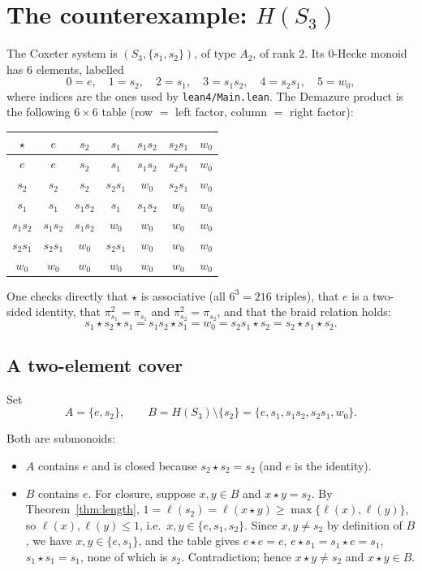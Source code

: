 \documentclass[11pt]{article}
\theoremstyle{definition}
\theoremstyle{remark}
\newcommand{\St}{\star}
\DeclareMathOperator{\len}{\ell}
\begin{document}
\section{The counterexample: $H(S_3)$}

The Coxeter system is $(S_3,\{s_1,s_2\})$, of type $A_2$, of rank $2$. Its
$0$-Hecke monoid has $6$ elements, labelled
\[
0=e,\quad 1=s_2,\quad 2=s_1,\quad 3=s_1s_2,\quad 4=s_2s_1,\quad 5=w_0,
\]
where indices are the ones used by \texttt{lean4/Main.lean}. The Demazure
product is the following $6\times 6$ table (row $=$ left factor, column $=$
right factor):

\begin{center}
\begin{tabular}{c|cccccc}
$\St$ & $e$ & $s_2$ & $s_1$ & $s_1s_2$ & $s_2s_1$ & $w_0$\\
\hline
$e$     & $e$     & $s_2$   & $s_1$   & $s_1s_2$ & $s_2s_1$ & $w_0$\\
$s_2$   & $s_2$   & $s_2$   & $s_2s_1$& $w_0$    & $s_2s_1$ & $w_0$\\
$s_1$   & $s_1$   & $s_1s_2$& $s_1$   & $s_1s_2$ & $w_0$    & $w_0$\\
$s_1s_2$& $s_1s_2$& $s_1s_2$& $w_0$   & $w_0$    & $w_0$    & $w_0$\\
$s_2s_1$& $s_2s_1$& $w_0$   & $s_2s_1$& $w_0$    & $w_0$    & $w_0$\\
$w_0$   & $w_0$   & $w_0$   & $w_0$   & $w_0$    & $w_0$    & $w_0$
\end{tabular}
\end{center}

One checks directly that $\St$ is associative (all $6^3=216$ triples), that
$e$ is a two-sided identity, that $\pi_{s_1}^2=\pi_{s_1}$ and
$\pi_{s_2}^2=\pi_{s_2}$, and that the braid relation holds:
\[
s_1\St s_2\St s_1=s_1s_2\St s_1=w_0=s_2s_1\St s_2=s_2\St s_1\St s_2 .
\]

\subsection{A two-element cover}

Set
\[
A=\{e,s_2\},\qquad B=H(S_3)\setminus\{s_2\}=\{e,s_1,s_1s_2,s_2s_1,w_0\}.
\]

Both are submonoids:

\begin{itemize}
\item $A$ contains $e$ and is closed because $s_2\St s_2=s_2$ (and $e$ is the
  identity).
\item $B$ contains $e$. For closure, suppose $x,y\in B$ and $x\St y=s_2$. By
  Theorem~\ref{thm:length},
  $1=\len(s_2)=\len(x\St y)\ge\max\{\len(x),\len(y)\}$, so
  $\len(x),\len(y)\le 1$, i.e.\ $x,y\in\{e,s_1,s_2\}$. Since $x,y\ne s_2$ by
  definition of $B$, we have $x,y\in\{e,s_1\}$, and the table gives
  $e\St e=e$, $e\St s_1=s_1\St e=s_1$, $s_1\St s_1=s_1$, none of which is
  $s_2$. Contradiction; hence $x\St y\ne s_2$ and $x\St y\in B$.
\end{itemize}
\end{document}

